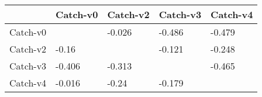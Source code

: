 \begin{tabular}{lllll}
\toprule
{} & Catch-v0 & Catch-v2 & Catch-v3 & Catch-v4 \\
\midrule
Catch-v0 &          &   -0.026 &   -0.486 &   -0.479 \\
Catch-v2 &    -0.16 &          &   -0.121 &   -0.248 \\
Catch-v3 &   -0.406 &   -0.313 &          &   -0.465 \\
Catch-v4 &   -0.016 &    -0.24 &   -0.179 &          \\
\bottomrule
\end{tabular}
